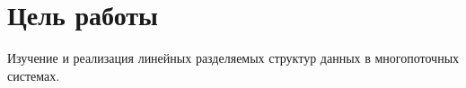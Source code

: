 \section{Цель работы}

Изучение 
и реализация линейных
разделяемых
структур данных
в многопоточных системах.